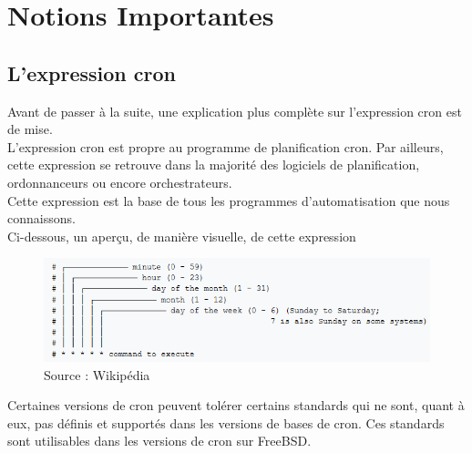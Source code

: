 \documentclass[12pt]{article}
\begin{document}
\section{Notions Importantes}

\subsection{L'expression cron}
Avant de passer à la suite, une explication plus complète sur l'expression cron est de mise.
\\
L'expression cron est propre au programme de planification cron. Par ailleurs, cette expression se retrouve dans la majorité des logiciels de planification, ordonnanceurs ou encore orchestrateurs.
\\
Cette expression est la base de tous les programmes d'automatisation que nous connaissons.
\\
Ci-dessous, un aperçu, de manière visuelle, de cette expression
\begin{figure}[ht]
    \includegraphics[scale=0.85]{images/cron.png}
    \caption{Source : Wikipédia}
\end{figure}

Certaines versions de cron peuvent tolérer certains standards qui ne sont, quant à eux, pas définis et supportés dans les versions de bases de cron. Ces standards sont utilisables dans les versions de cron sur FreeBSD.
\vspace{0.5cm}
\end{document}
